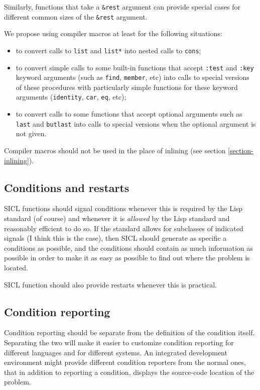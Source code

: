 \documentclass{article}
\def\sysname{SICL}
\begin{document}
Similarly, functions that take a \texttt{\&rest} argument can provide
special cases for different common sizes of the \texttt{\&rest}
argument.

We propose using compiler macros at least for the following
situations: 

\begin{itemize}
\item to convert calls to \texttt{list} and \texttt{list*} into nested
  calls to \texttt{cons};
\item to convert simple calls to some built-in functions that accept
  \texttt{:test} and \texttt{:key} keyword arguments (such as
  \texttt{find}, \texttt{member}, etc) into calls to
  special versions of these procedures with particularly simple
  functions for these keyword arguments (\texttt{identity},
  \texttt{car}, \texttt{eq}, etc);
\item to convert calls to some functions that accept optional
  arguments such as \texttt{last} and \texttt{butlast} into calls to
  special versions when the optional argument is not given.
\end{itemize}

Compiler macros should not be used in the place of inlining (see
section \ref{section-inlining}).

\subsection{Conditions and restarts}

\sysname{} functions should signal conditions whenever this is
required by the Lisp standard (of course) and whenever it is
\emph{allowed} by the Lisp standard and reasonably efficient to do so.
If the standard allows for subclasses of indicated signals (I think
this is the case), then \sysname{} should generate as specific a
conditions as possible, and the conditions should contain as much
information as possible in order to make it as easy as possible to
find out where the problem is located.

\sysname{} function should also provide restarts whenever this is
practical. 

\subsection{Condition reporting}

Condition reporting should be separate from the definition of the
condition itself.  Separating the two will make it easier to customize
condition reporting for different languages and for different
systems.  An integrated development environment might provide
different condition reporters from the normal ones, that in addition
to reporting a condition, displays the source-code location of the
problem. 
\end{document}
